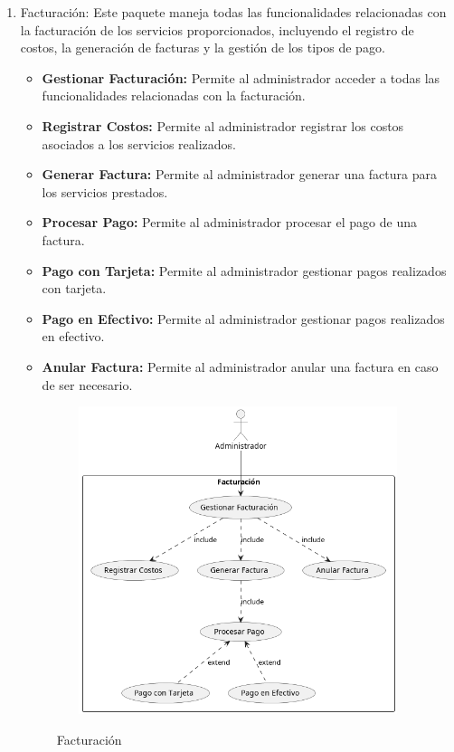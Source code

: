 \begin{enumerate}
	\item Facturación:
	Este paquete maneja todas las funcionalidades relacionadas con la facturación de los servicios proporcionados, incluyendo el registro de costos, la generación de facturas y la gestión de los tipos de pago.
	\begin{itemize}
		\item \textbf{Gestionar Facturación:} Permite al administrador acceder a todas las funcionalidades relacionadas con la facturación.
		\item \textbf{Registrar Costos:} Permite al administrador registrar los costos asociados a los servicios realizados.
		\item \textbf{Generar Factura:} Permite al administrador generar una factura para los servicios prestados.
		\item \textbf{Procesar Pago:} Permite al administrador procesar el pago de una factura.
		\item \textbf{Pago con Tarjeta:} Permite al administrador gestionar pagos realizados con tarjeta.
		\item \textbf{Pago en Efectivo:} Permite al administrador gestionar pagos realizados en efectivo.
		\item \textbf{Anular Factura:} Permite al administrador anular una factura en caso de ser necesario.
	\end{itemize}
	\begin{figure}[H]
		\centering
		\caption{Facturación}
		\includegraphics[width=12cm, height=9cm]{imagenes/cap4/casosUso/Facturacion.png}
		\label{fig:Caso6}
	\end{figure}      
	

\end{enumerate}
